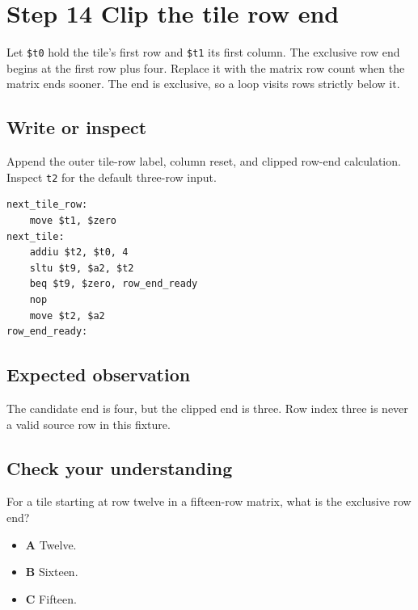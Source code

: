 \section{Step 14 Clip the tile row end}\label{transpose-s14}

Let \texttt{\$t0} hold the tile's first row and \texttt{\$t1} its first column. The exclusive row end begins at the first row plus four. Replace it with the matrix row count when the matrix ends sooner. The end is exclusive, so a loop visits rows strictly below it.

\subsection{Write or inspect}
Append the outer tile-row label, column reset, and clipped row-end calculation. Inspect \texttt{t2} for the default three-row input.

\begin{verbatim}
next_tile_row:
    move $t1, $zero
next_tile:
    addiu $t2, $t0, 4
    sltu $t9, $a2, $t2
    beq $t9, $zero, row_end_ready
    nop
    move $t2, $a2
row_end_ready:
\end{verbatim}

\subsection{Expected observation}
The candidate end is four, but the clipped end is three. Row index three is never a valid source row in this fixture.

\subsection{Check your understanding}
For a tile starting at row twelve in a fifteen-row matrix, what is the exclusive row end?

\begin{itemize}
  \item \textbf{A} Twelve.
  \item \textbf{B} Sixteen.
  \item \textbf{C} Fifteen.
\end{itemize}
